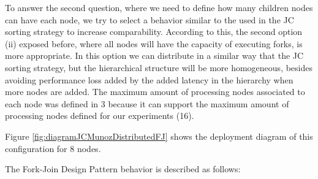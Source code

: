 To answer the second question, where we need to define how many children nodes can have each node, we try to select a behavior similar to the used in the JC sorting strategy to increase comparability. According to this, the second option (ii) exposed before, where all nodes will have the capacity of executing forks, is more appropriate. In this option we can distribute in a similar way that the JC sorting strategy, but the hierarchical structure will be more homogeneous, besides avoiding performance loss added by the added latency in the hierarchy when more nodes are added. The maximum amount of processing nodes associated to each node was defined in 3 because it can support the maximum amount of processing nodes defined for our experiments (16).

Figure \ref{fig:diagramJCMunozDistributedFJ} shows the deployment diagram of this configuration for 8 nodes.

The Fork-Join Design Pattern behavior is described as follows:

